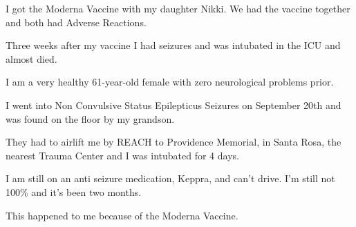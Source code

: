 I got the Moderna Vaccine with my daughter Nikki. We had the vaccine together
and both had Adverse Reactions.

Three weeks after my vaccine I had seizures and was intubated in the ICU and
almost died.

I am a very healthy 61-year-old female with zero neurological problems prior.

I went into Non Convulsive Status Epilepticus Seizures on September 20th and was
found on the floor by my grandson.

They had to airlift me by REACH to Providence Memorial, in Santa Rosa, the
nearest Trauma Center and I was intubated for 4 days.

I am still on an anti seizure medication, Keppra, and can’t drive. I’m still not
100\% and it’s been two months.

This happened to me because of the Moderna Vaccine.


